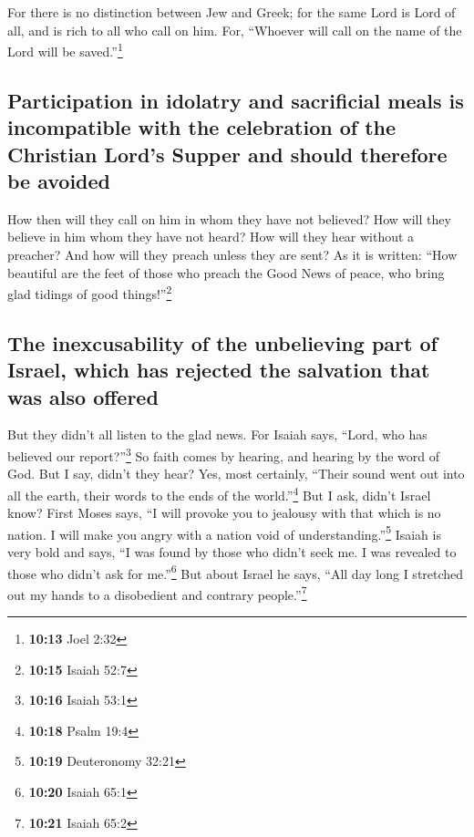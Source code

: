  For there is no distinction between Jew and Greek; for
the same Lord is Lord of all, and is rich to all who call on him.
 For, ``Whoever will call on the name of the Lord will be
saved.''\footnote{\textbf{10:13} Joel 2:32}

\hypertarget{participation-in-idolatry-and-sacrificial-meals-is-incompatible-with-the-celebration-of-the-christian-lords-supper-and-should-therefore-be-avoided}{%
\subsection{Participation in idolatry and sacrificial meals is
incompatible with the celebration of the Christian Lord's Supper and
should therefore be
avoided}\label{participation-in-idolatry-and-sacrificial-meals-is-incompatible-with-the-celebration-of-the-christian-lords-supper-and-should-therefore-be-avoided}}

 How then will they call on him in whom they have not
believed? How will they believe in him whom they have not heard? How
will they hear without a preacher?  And how will they
preach unless they are sent? As it is written: ``How beautiful are the
feet of those who preach the Good News of peace, who bring glad tidings
of good things!''\footnote{\textbf{10:15} Isaiah 52:7}

\hypertarget{the-inexcusability-of-the-unbelieving-part-of-israel-which-has-rejected-the-salvation-that-was-also-offered}{%
\subsection{The inexcusability of the unbelieving part of Israel, which
has rejected the salvation that was also
offered}\label{the-inexcusability-of-the-unbelieving-part-of-israel-which-has-rejected-the-salvation-that-was-also-offered}}

 But they didn't all listen to the glad news. For Isaiah
says, ``Lord, who has believed our report?''\footnote{\textbf{10:16}
  Isaiah 53:1}  So faith comes by hearing, and hearing by
the word of God.  But I say, didn't they hear? Yes, most
certainly, ``Their sound went out into all the earth, their words to the
ends of the world.''\footnote{\textbf{10:18} Psalm 19:4} 
But I ask, didn't Israel know? First Moses says, ``I will provoke you to
jealousy with that which is no nation. I will make you angry with a
nation void of understanding.''\footnote{\textbf{10:19} Deuteronomy
  32:21}  Isaiah is very bold and says, ``I was found by
those who didn't seek me. I was revealed to those who didn't ask for
me.''\footnote{\textbf{10:20} Isaiah 65:1}  But about
Israel he says, ``All day long I stretched out my hands to a disobedient
and contrary people.''\footnote{\textbf{10:21} Isaiah 65:2}

